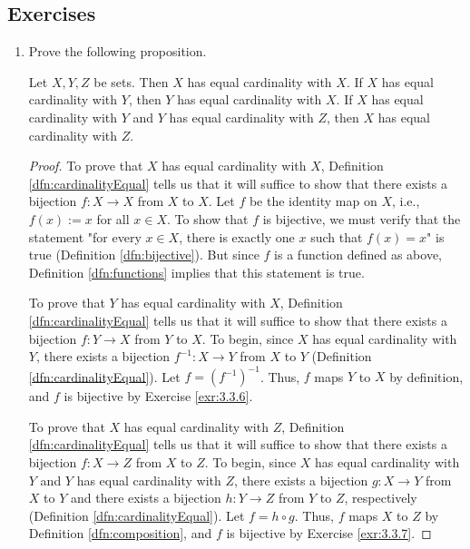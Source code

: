 \documentclass[../main.tex]{subfiles}
\begin{document}
\subsection*{Exercises}
\begin{enumerate}[ref={\thesection.\arabic*}]
    \item \label{exr:3.6.1}Prove the following proposition.
    \begin{prp}
        Let $X,Y,Z$ be sets. Then $X$ has equal cardinality with $X$. If $X$ has equal cardinality with $Y$, then $Y$ has equal cardinality with $X$. If $X$ has equal cardinality with $Y$ and $Y$ has equal cardinality with $Z$, then $X$ has equal cardinality with $Z$.
        \begin{proof}
            To prove that $X$ has equal cardinality with $X$, Definition \ref{dfn:cardinalityEqual} tells us that it will suffice to show that there exists a bijection $f:X\to X$ from $X$ to $X$. Let $f$ be the identity map on $X$, i.e., $f(x):=x$ for all $x\in X$. To show that $f$ is bijective, we must verify that the statement "for every $x\in X$, there is exactly one $x$ such that $f(x)=x$" is true (Definition \ref{dfn:bijective}). But since $f$ is a function defined as above, Definition \ref{dfn:functions} implies that this statement is true.\par
            To prove that $Y$ has equal cardinality with $X$, Definition \ref{dfn:cardinalityEqual} tells us that it will suffice to show that there exists a bijection $f:Y\to X$ from $Y$ to $X$. To begin, since $X$ has equal cardinality with $Y$, there exists a bijection $f^{-1}:X\to Y$ from $X$ to $Y$ (Definition \ref{dfn:cardinalityEqual}). Let $f=(f^{-1})^{-1}$. Thus, $f$ maps $Y$ to $X$ by definition, and $f$ is bijective by Exercise \ref{exr:3.3.6}.\par
            To prove that $X$ has equal cardinality with $Z$, Definition \ref{dfn:cardinalityEqual} tells us that it will suffice to show that there exists a bijection $f:X\to Z$ from $X$ to $Z$. To begin, since $X$ has equal cardinality with $Y$ and $Y$ has equal cardinality with $Z$, there exists a bijection $g:X\to Y$ from $X$ to $Y$ and there exists a bijection $h:Y\to Z$ from $Y$ to $Z$, respectively (Definition \ref{dfn:cardinalityEqual}). Let $f=h\circ g$. Thus, $f$ maps $X$ to $Z$ by Definition \ref{dfn:composition}, and $f$ is bijective by Exercise \ref{exr:3.3.7}.
        \end{proof}
    \end{prp}
\end{enumerate}
\end{document}
